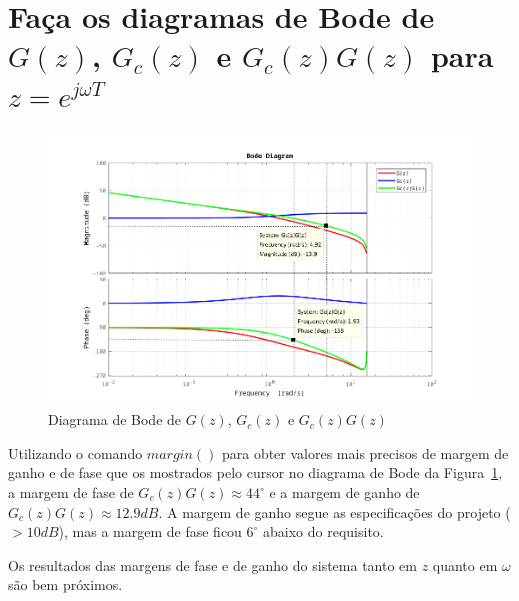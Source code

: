 \documentclass{article}
\begin{document}
\section{\normalsize{Faça os diagramas de Bode de $G(z)$, $G_c(z)$ e $G_c(z)G(z)$ para $z = e^{j\omega T}$}}
    \begin{figure}[H]
       \centering
            \includegraphics[width=1\linewidth]{images/bode_z.png}
            \caption{Diagrama de Bode de $G(z)$, $G_c(z)$ e $G_c(z)G(z)$}
            \label{fig:bode_z}
    \end{figure}

    {Utilizando o comando $margin()$ para obter valores mais precisos de margem de ganho e de fase que os mostrados pelo cursor no diagrama de Bode da Figura~\ref{fig:bode_z}, a margem de fase de $G_c(z)G(z) \approx 44^\circ$ e a margem de ganho de $G_c(z)G(z) \approx 12.9 dB$. A margem de ganho segue as especificações do projeto ($> 10 dB$), mas a margem de fase ficou $6^\circ$ abaixo do requisito.}

    {Os resultados das margens de fase e de ganho do sistema tanto em $z$ quanto em $\omega$ são bem próximos.}
\end{document}
